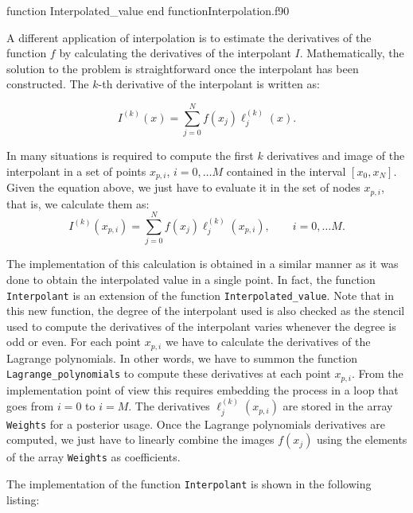     
    
    \vspace{0.5cm} 
    {function Interpolated_value}
    {end function}{Interpolation.f90}
    
    
    
    A different application of interpolation is to estimate the derivatives of the function $f$ by calculating the derivatives of the interpolant $I$. Mathematically, the solution to the problem is straightforward once the interpolant has been constructed. The $k$-th derivative of the interpolant is written as:
    
    \begin{equation}
    I^{(k)}(x) = \sum_{j=0}^{N}  f(x_j) \ell_j^{(k)} (x).
    \end{equation}
    
    In many situations is required to compute the first $k$ derivatives and image of the interpolant in a set of points $x_{p,i}$, $ i = 0,\ldots M$ contained in the interval $[x_0,x_N]$. Given the equation above, we just have to evaluate it in the set of nodes $x_{p,i}$, that is, we calculate them as:
    \begin{equation}
    I^{(k)}(x_{p,i}) = \sum_{j=0}^{N}  f(x_j) \ell_j^{(k)} (x_{p,i}), \qquad i = 0,\ldots M .
    \end{equation}
    
    The implementation of this calculation is obtained in a similar manner as it was done to obtain the interpolated value in a single point. In fact, the function \verb|Interpolant| is an extension of the function \verb|Interpolated_value|. Note that in this new function, the degree of the interpolant used is also checked as the stencil used to compute the derivatives of the interpolant varies whenever the degree is odd or even. For each point $x_{p,i}$ we have to calculate the derivatives of the Lagrange polynomials. In other words, we have to summon the function \verb|Lagrange_polynomials| to compute these derivatives at each point $x_{p,i}$. From the implementation point of view this requires embedding the process in a loop that goes from $i=0$ to $i=M$. The derivatives $\ell_j^{(k)} (x_{p,i})$ are stored in the array \verb|Weights| for a posterior usage. Once the Lagrange polynomials derivatives are computed, we just have to linearly combine the images $f(x_j)$ using the elements of the array \verb|Weights| as coefficients. 
    
    The implementation of the function \verb|Interpolant| is shown in the following listing:
    
